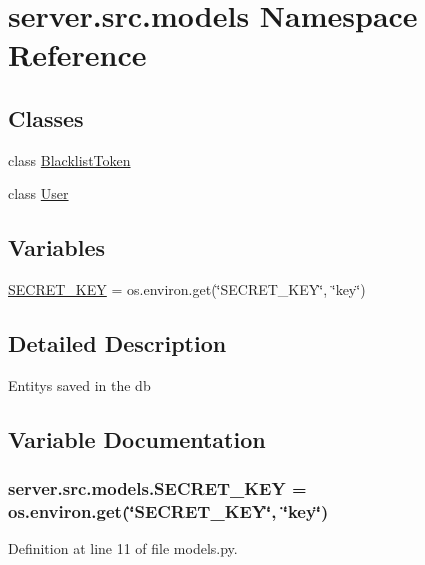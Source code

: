 \hypertarget{namespaceserver_1_1src_1_1models}{}\section{server.\+src.\+models Namespace Reference}
\label{namespaceserver_1_1src_1_1models}
\subsection*{Classes}
\begin{DoxyCompactItemize}
\item 
class \hyperlink{classserver_1_1src_1_1models_1_1_blacklist_token}{Blacklist\+Token}
\item 
class \hyperlink{classserver_1_1src_1_1models_1_1_user}{User}
\end{DoxyCompactItemize}
\subsection*{Variables}
\begin{DoxyCompactItemize}
\item 
\hyperlink{namespaceserver_1_1src_1_1models_aab444ae0b57d9be125bb8e6868a65c75}{S\+E\+C\+R\+E\+T\+\_\+\+K\+EY} = os.\+environ.\+get(\char`\"{}S\+E\+C\+R\+E\+T\+\_\+\+K\+EY\char`\"{}, \char`\"{}key\char`\"{})
\end{DoxyCompactItemize}


\subsection{Detailed Description}
\begin{DoxyVerb}Entitys saved in the db\end{DoxyVerb}
 

\subsection{Variable Documentation}
\subsubsection[{\texorpdfstring{S\+E\+C\+R\+E\+T\+\_\+\+K\+EY}{SECRET_KEY}}]{\setlength{\rightskip}{0pt plus 5cm}server.\+src.\+models.\+S\+E\+C\+R\+E\+T\+\_\+\+K\+EY = os.\+environ.\+get(\char`\"{}S\+E\+C\+R\+E\+T\+\_\+\+K\+EY\char`\"{}, \char`\"{}key\char`\"{})}\hypertarget{namespaceserver_1_1src_1_1models_aab444ae0b57d9be125bb8e6868a65c75}{}\label{namespaceserver_1_1src_1_1models_aab444ae0b57d9be125bb8e6868a65c75}


Definition at line 11 of file models.\+py.

